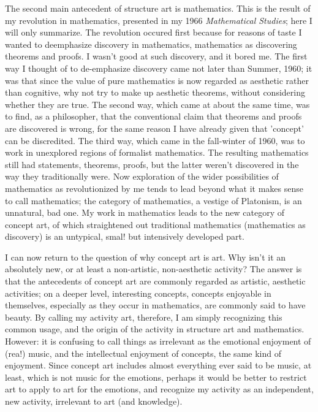\documentclass[10pt,twoside]{memoir}
\newcommand{\essaytitle}[1]{
	\emph{#1}}
\begin{document}
\begin{enumerate}
{\begin{enumerate}
\begin{sysrules}
\begin{sysrules}
\begin{sysrules}
\begin{sysrules}
{\begin{enumerate}
The second main antecedent of structure art is mathematics. This is the 
result of my revolution in mathematics, presented in my 1966 \essaytitle{Mathematical 
Studies}; here I will only summarize. The revolution occured first because for 
reasons of taste I wanted to deemphasize discovery in mathematics, 
mathematics as discovering theorems and proofs. I wasn't good at such 
discovery, and it bored me. The first way I thought of to de-emphasize 
discovery came not later than Summer, 1960; it was that since the value of 
pure mathematics is now regarded as aesthetic rather than cognitive, why not 
try to make up aesthetic theorems, without considering whether they are 
true. The second way, which came at about the same time, was to find, as a 
philosopher, that the conventional claim that theorems and proofs are 
discovered is wrong, for the same reason I have already given that 'concept' 
can be discredited. The third way, which came in the fall-winter of 1960, 
was to work in unexplored regions of formalist mathematics. The resulting 
mathematics still had statements, theorems, proofs, but the latter weren't 
discovered in the way they traditionally were. Now exploration of the wider 
possibilities of mathematics as revolutionized by me tends to lead beyond 
what it makes sense to call mathematics; the category of mathematics, a 
vestige of Platonism, is an unnatural, bad one. My work in mathematics leads 
to the new category of concept art, of which straightened out traditional 
mathematics (mathematics as discovery) is an untypical, smal! but 
intensively developed part. 

I can now return to the question of why concept art is art. Why isn't it an 
absolutely new, or at least a non-artistic, non-aesthetic activity? The answer 
is that the antecedents of concept art are commonly regarded as artistic, 
aesthetic activities; on a deeper level, interesting concepts, concepts 
enjoyable in themselves, especially as they occur in mathematics, are 
commonly said to have beauty. By calling my activity art, therefore, I am 
simply recognizing this common usage, and the origin of the activity in 
structure art and mathematics. However: it is confusing to call things as 
irrelevant as the emotional enjoyment of (rea!) music, and the intellectual 
enjoyment of concepts, the same kind of enjoyment. Since concept art 
includes almost everything ever said to be music, at least, which is not music 
for the emotions, perhaps it would be better to restrict art to apply to art for 
the emotions, and recognize my activity as an independent, new activity, 
irrelevant to art (and knowledge). 


\end{enumerate}}
\end{sysrules}
\end{sysrules}
\end{sysrules}
\end{sysrules}
\end{enumerate}}
\end{enumerate}
\end{document}
